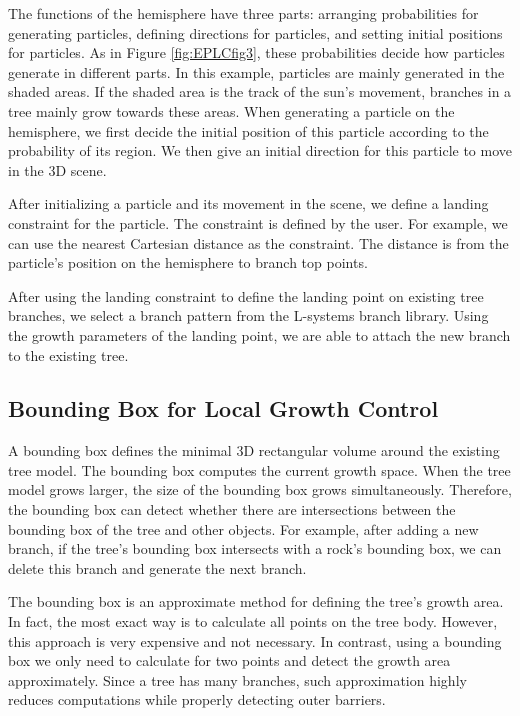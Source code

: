The functions of the hemisphere have three parts: arranging probabilities for generating particles, defining directions for particles, and setting initial positions for particles. As in Figure \ref{fig:EPLCfig3}, these probabilities decide how particles generate in different parts. In this example, particles are mainly generated in the shaded areas. If the shaded area is the track of the sun's movement, branches in a tree mainly grow towards these areas. When generating a particle on the hemisphere, we first decide the initial position of this particle according to the probability of its region. We then give an initial direction for this particle to move in the 3D scene.

After initializing a particle and its movement in the scene, we define a landing constraint for the particle. The constraint is defined by the user. For example, we can use the nearest Cartesian distance as the constraint. The distance is from the particle's position on the hemisphere to branch top points.

After using the landing constraint to define the landing point on existing tree branches, we select a branch pattern from the L-systems branch library. Using the growth parameters of the landing point, we are able to attach the new branch to the existing tree.

\subsection{Bounding Box for Local Growth Control}

A bounding box defines the minimal 3D rectangular volume around the existing tree model. The bounding box computes the current growth space. When the tree model grows larger, the size of the bounding box grows simultaneously. Therefore, the bounding box can detect whether there are intersections between the bounding box of the tree and other objects. For example, after adding a new branch, if the tree's bounding box intersects with a rock's bounding box, we can delete this branch and generate the next branch.

The bounding box is an approximate method for defining the tree's growth area. In fact, the most exact way is to calculate all points on the tree body. However, this approach is very expensive and not necessary. In contrast, using a bounding box we only need to calculate for two points and detect the growth area approximately. Since a tree has many branches, such approximation highly reduces computations while properly detecting outer barriers.

